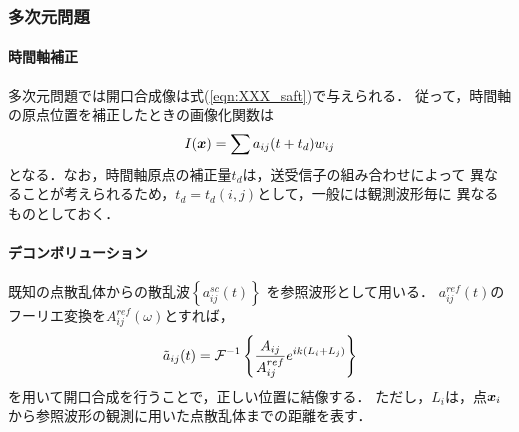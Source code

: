 \subsubsection{多次元問題}
\paragraph{時間軸補正}
多次元問題では開口合成像は式(\ref{eqn:XXX_saft})で与えられる．
従って，時間軸の原点位置を補正したときの画像化関数は
\begin{equation}
	I(\mbox{\boldmath $x$})=\sum a_{ij}(t+t_d)w_{ij}
	\label{eqn:XXX_27}
\end{equation}
となる．なお，時間軸原点の補正量$t_d$は，送受信子の組み合わせによって
異なることが考えられるため，$t_d=t_d(i,j)$として，一般には観測波形毎に
異なるものとしておく．
\paragraph{デコンボリューション}
既知の点散乱体からの散乱波$\left\{ a_{ij}^{sc}(t)\right\}$
を参照波形として用いる．
$a_{ij}^{ref}(t)$のフーリエ変換を$A^{ref}_{ij}(\omega)$とすれば，
\begin{equation}
	\tilde a_{ij}(t) = {\cal F}^{-1} 
	\left\{
		\frac{A_{ij}}{A_{ij}^{ref}}e^{ik(L_i+L_j)}
	\right\}
	\label{eqn:XXX_28}
\end{equation}
を用いて開口合成を行うことで，正しい位置に結像する．
ただし，$L_i$は，点$\mbox{\boldmath $x$}_i$から参照波形の観測に用いた点散乱体までの距離を表す．
%

